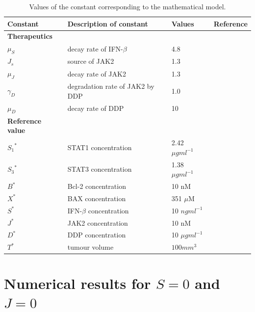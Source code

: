  \begin{table}[hbt!]
\begin{center}
    \begin{tabular}{p{2.5cm}|p{6cm}|p{2cm}|p{2cm}}
    \hline
  \textbf{Constant} &  \textbf{Description of constant} &\textbf{Values} &\textbf{Reference}
    \\
    \hline \hline
\textbf{Therapeutics}& & &\\
 ${\mu_S}$& decay rate of IFN-$\beta$ &4.8& \cite{salmon1996pharmacokinetics}\\
 ${J_s}$& source of JAK2&1.3& \cite{lin2008fc}\\
 ${\mu_J}$& decay rate of JAK2 &1.3& \cite{lin2008fc}\\
 ${\gamma_D}$& degradation rate of JAK2 by DDP &1.0& \cite{lee2021mathematical}\\
     ${\mu_D}$&decay rate of DDP &10& \cite{crom1981cisplatin}\\
\textbf{Reference value}& & &\\
${S_1}^*$&STAT1 concentration&2.42 $\mu g ml^{-1}$& \cite{liu2014active}\\
${S_3}^*$&STAT3 concentration&1.38 $\mu g ml^{-1}$&\cite{liu2014active}\\
$B^*$&Bcl-2 concentration&10 nM & \cite{vickers2017animal}\\
$X^*$&BAX concentration&351  $\mu$M &\cite{vickers2017animal}\\
$S^*$&IFN-$\beta$ concentration&10 $ng ml^{-1}$& \cite{yu2009transcriptional}\\
$J^*$&JAK2 concentration&10 nM& \cite{lee2021mathematical,yu2009transcriptional}\\
$D^*$&DDP concentration&10 $\mu g ml^{-1}$&\cite{lee2021mathematical}\\
$T^*$&tumour volume&$100mm^3$&\cite{lee2021mathematical}\\
 \hline
    \end{tabular}
    \caption{Values of the constant corresponding to the mathematical model.}
    \label{tabR2}
    \end{center}
\end{table}


\section{Numerical results for $S =0$ and $J=0$}
\paragraph{}

